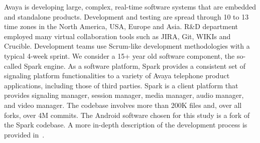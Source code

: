 \documentclass[smallextended]{svjour3}       %
\begin{document}
Avaya is developing large, complex, real-time software systems that
are embedded and standalone products. Development and testing are
spread through 10 to 13 time zones in the North America, USA, Europe
and Asia. R\&D department employed many virtual collaboration tools
such as JIRA, Git, WIKIs and Crucible. Development teams use
Scrum-like development methodologies with a typical 4-week
sprint. We consider a 15+ year old software component, the so-called
Spark engine.  As a software platform, Spark provides a consistent
set of signaling platform functionalities to a variety of Avaya
telephone product applications, including those of third parties.
Spark is a client platform that provides signaling manager, session
manager, media manager, audio manager, and video manager. The
codebase involves more than 200K files and, over all forks, over 4M
commits.  The Android software chosen for this study is a fork of
the Spark codebase. A more in-depth description of the development
process is provided in~\cite{amhp14}.
\end{document}

